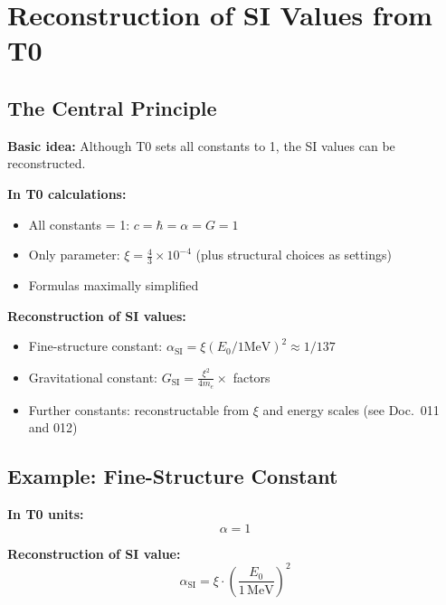 	\section{Reconstruction of SI Values from T0}
	\label{sec:si_reconstruction}
	
	\subsection{The Central Principle}
	
	\textbf{Basic idea:} Although T0 sets all constants to 1, the SI values can be reconstructed.
	
	\begin{tcolorbox}[colback=green!5!white,colframe=green!75!black,title=T0 Reconstruction]
		\textbf{In T0 calculations:}
		\begin{itemize}
			\item All constants = 1: $c = \hbar = \alpha = G = 1$
			\item Only parameter: $\xi = \frac{4}{3} \times 10^{-4}$ (plus structural choices as settings)
			\item Formulas maximally simplified
		\end{itemize}
		
		\textbf{Reconstruction of SI values:}
		\begin{itemize}
			\item Fine-structure constant: $\alpha_{\text{SI}} = \xi(E_0/1\text{MeV})^2 \approx 1/137$
			\item Gravitational constant: $G_{\text{SI}} = \frac{\xi^2}{4m_e} \times$ factors
			\item Further constants: reconstructable from $\xi$ and energy scales (see Doc.~011 and 012)
		\end{itemize}
	\end{tcolorbox}
	
	\subsection{Example: Fine-Structure Constant}
	
	\textbf{In T0 units:}
	\begin{equation}
		\alpha = 1
	\end{equation}
	
	\textbf{Reconstruction of SI value:}
	\begin{equation}
		\alpha_{\text{SI}} = \xi \cdot \left(\frac{E_0}{1\,\text{MeV}}\right)^2
	\end{equation}
	
